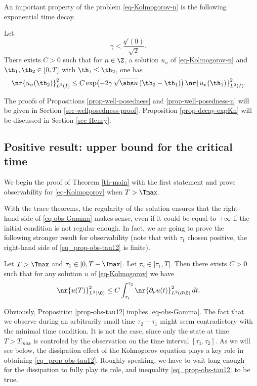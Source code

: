 An important property of the problem \eqref{eq-Kolmogorov-n} is the following exponential time decay.

\begin{proposition} \label{prop-decay-expKn}
Let
\[
\gamma < \frac{q'(0)}{\sqrt{2}}.
\]
There exists $C>0$ such that for $n \in \Z$, a solution $u_n$ of \eqref{eq-Kolmogorov-n} and $\th_1,\th_2 \in [0,T]$ with $\th_1 \leq \th_2$, one has
\[
\nr{u_n(\th_2)}_{L^2(I)}^2 \leq C \exp \bigl(- 2 \gamma\,\sqrt{\abs n}\,(\th_2-\th_1)\bigr)\, \nr{u_n(\th_1)}_{L^2(I)}^2.
\]
\end{proposition}

The proofs of Propositions \ref{prop-well-posedness} and \ref{prop-well-posedness-n} will be given in Section \ref{sec-wellposedness-proof}. Proposition \ref{prop-decay-expKn} will be discussed in Section \ref{sec-Henry}.

\subsection{Positive result: upper bound for the critical time}

We begin the proof of Theorem \ref{th-main} with the first statement and prove observability for \eqref{eq-Kolmogorov} when $T > \Tmax$.

With the trace theorems, the regularity of the solution ensures that the right-hand side of \eqref{eq-obs-Gamma} makes sense, even if it could be equal to $+\infty$ if the initial condition is not regular enough. In fact, we are going to prove the following stronger result for observability (note that with $\tau_1$ chosen positive, the right-hand side of \eqref{eq_prop-obs-tau12} is finite).

\begin{proposition} \label{prop-obs-tau12}
Let $T > \Tmax$ and $\tau_1 \in{}]0,T-\Tmax[$. Let $\tau_2 \in{}]\tau_1,T]$. Then there exists $C > 0$ such that for any solution $u$ of \eqref{eq-Kolmogorov} we have
\begin{equation} \label{eq_prop-obs-tau12}
\nr{u(T)}_{L^2(\O)}^2 \leq C \int_{\tau_1}^{\tau_2} \nr{\partial_\nu u(t)}_{L^2(\partial \O)}^2 \, dt.
\end{equation}
\end{proposition}

Obviously, Proposition \ref{prop-obs-tau12} implies \eqref{eq-obs-Gamma}. The fact that we observe during an arbitrarily small time $\tau_2 - \tau_1$ might seem contradictory with the minimal time condition. It is not the case, since only the state at time $T>T_{max}$ is controled by the observation on the
time interval $[\tau_1,\tau_2]$. As we will see below, the dissipation effect of the Kolmogorov equation plays a key role in obtaining \eqref{eq_prop-obs-tau12}. Roughly speaking, we have to wait long enough for the dissipation to fully play its role, and
inequality \eqref{eq_prop-obs-tau12} to be true.

